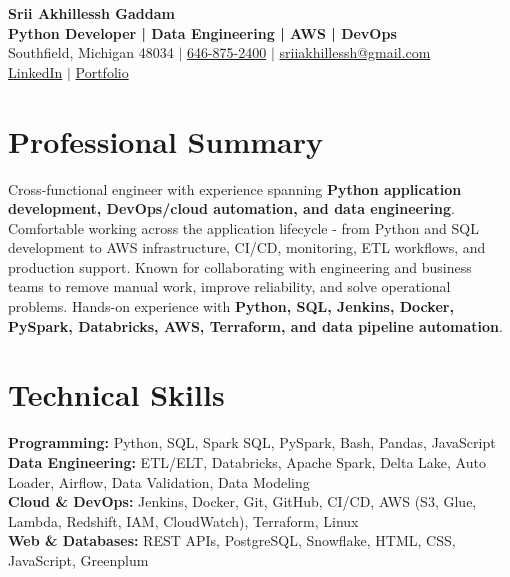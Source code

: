 \documentclass[letterpaper,10pt]{article}
\begin{document}
\fontsize{9.35pt}{10.45pt}\selectfont

\begin{center}
    {\LARGE \textbf{Srii Akhillessh Gaddam}} \\[-1pt]
    \textbf{Python Developer | Data Engineering | AWS | DevOps} \\[2pt]
    Southfield, Michigan 48034 $|$
    \href{tel:6468752400}{646-875-2400} $|$
    \href{mailto:sriiakhillessh@gmail.com}{sriiakhillessh@gmail.com} \\[1pt]
    \href{https://www.linkedin.com/in/srii-akhiilessh-gaddam-b48668191/}{LinkedIn} $|$
    \href{https://sriiakhillesshg.github.io/portfolio/}{Portfolio}
\end{center}
\vspace{-8pt}

\section{Professional Summary}
\small{Cross-functional engineer with experience spanning \textbf{Python application development, DevOps/cloud automation, and data engineering}. Comfortable working across the application lifecycle - from Python and SQL development to AWS infrastructure, CI/CD, monitoring, ETL workflows, and production support. Known for collaborating with engineering and business teams to remove manual work, improve reliability, and solve operational problems. Hands-on experience with \textbf{Python, SQL, Jenkins, Docker, PySpark, Databricks, AWS, Terraform, and data pipeline automation}.}

\section{Technical Skills}
\small{
\textbf{Programming:} Python, SQL, Spark SQL, PySpark, Bash, Pandas, JavaScript \\
\textbf{Data Engineering:} ETL/ELT, Databricks, Apache Spark, Delta Lake, Auto Loader, Airflow, Data Validation, Data Modeling \\
\textbf{Cloud \& DevOps:} Jenkins, Docker, Git, GitHub, CI/CD, AWS (S3, Glue, Lambda, Redshift, IAM, CloudWatch), Terraform, Linux \\
\textbf{Web \& Databases:} REST APIs, PostgreSQL, Snowflake, HTML, CSS, JavaScript, Greenplum
}
\end{document}
